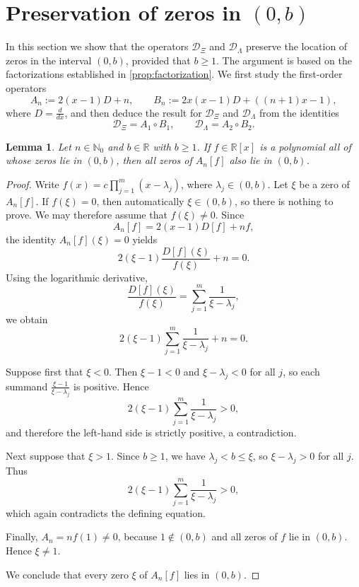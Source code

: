\documentclass[11pt,twoside]{article}
\newtheorem{lemma}[theorem]{Lemma}
\numberwithin{equation}{section}
\begin{document}
\section{Preservation of zeros in \texorpdfstring{$(0,b)$}{(0,b)}}

In this section we show that the operators \(\mathcal D_{\Xi}\) and \(\mathcal D_{\Lambda}\) preserve the location of zeros in the interval \((0,b)\), provided that \(b\ge 1\). The argument is based on the factorizations established in \cref{prop:factorization}. We first study the first-order operators
\[
A_n:=2(x-1)D+n,
\qquad
B_n:=2x(x-1)D+((n+1)x-1),
\]
where \(D=\frac{d}{dx}\), and then deduce the result for \(\mathcal D_{\Xi}\) and \(\mathcal D_{\Lambda}\) from the identities
\[
\mathcal D_{\Xi}=A_1\circ B_1,
\qquad
\mathcal D_{\Lambda}=A_2\circ B_2.
\]

\begin{lemma}\label{lem:An-interval-0b}
Let \(n \in \mathbb{N}_0\) and \(b\in\mathbb R\) with \(b\ge 1\). If \(f\in\mathbb R[x]\) is a polynomial all of whose zeros lie in \((0,b)\), then all zeros of \(A_n[f]\) also lie in \((0,b)\).
\end{lemma}

\begin{proof}
Write \(f(x)=c\prod_{j=1}^m (x-\lambda_j)\), where \(\lambda_j\in(0,b)\). Let \(\xi\) be a zero of \(A_n[f]\). If \(f(\xi)=0\), then automatically \(\xi\in(0,b)\), so there is nothing to prove. We may therefore assume that \(f(\xi)\neq 0\). Since
\[
A_n[f]=2(x-1)D[f]+nf,
\]
the identity \(A_n[f](\xi)=0\) yields
\[
2(\xi-1)\frac{D[f](\xi)}{f(\xi)}+n=0.
\]
Using the logarithmic derivative,
\[
\frac{D[f](\xi)}{f(\xi)}
=
\sum_{j=1}^m \frac{1}{\xi-\lambda_j},
\]
we obtain
\[
2(\xi-1)\sum_{j=1}^m \frac{1}{\xi-\lambda_j}+n=0.
\]

Suppose first that \(\xi<0\). Then \(\xi-1<0\) and \(\xi-\lambda_j<0\) for all \(j\), so each summand \(\displaystyle \frac{\xi-1}{\xi-\lambda_j}\) is positive. Hence
\[
2(\xi-1)\sum_{j=1}^m \frac{1}{\xi-\lambda_j}>0,
\]
and therefore the left-hand side is strictly positive, a contradiction.

Next suppose that \(\xi>1\). Since \(b\ge 1\), we have \(\lambda_j<b\le \xi\), so \(\xi-\lambda_j>0\) for all \(j\). Thus
\[
2(\xi-1)\sum_{j=1}^m \frac{1}{\xi-\lambda_j}>0,
\]
which again contradicts the defining equation.

Finally, \(A_n=n f(1)\neq 0\), because \(1\notin(0,b)\) and all zeros of \(f\) lie in \((0,b)\). Hence \(\xi\neq 1\).

We conclude that every zero \(\xi\) of \(A_n[f]\) lies in \((0,b)\).
\end{proof}
\end{document}

